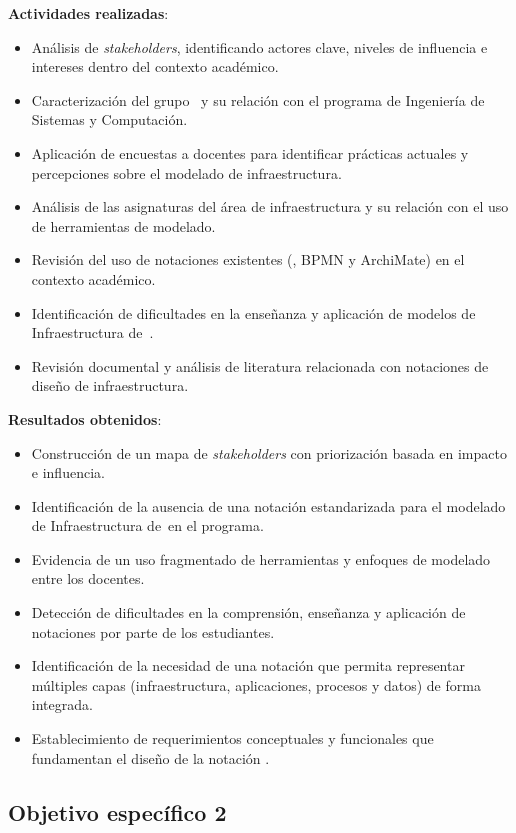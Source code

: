 \textbf{Actividades realizadas}:
\begin{itemize}
    \item Análisis de \textit{stakeholders}, identificando actores clave, niveles de influencia e intereses dentro del contexto académico.
    \item Caracterización del grupo \GRID~y su relación con el programa de Ingeniería de Sistemas y Computación.
    \item Aplicación de encuestas a docentes para identificar prácticas actuales y percepciones sobre el modelado de infraestructura.
    \item Análisis de las asignaturas del área de infraestructura y su relación con el uso de herramientas de modelado.
    \item Revisión del uso de notaciones existentes (\UML, BPMN y ArchiMate) en el contexto académico.
    \item Identificación de dificultades en la enseñanza y aplicación de modelos de Infraestructura de~\TI.
    \item Revisión documental y análisis de literatura relacionada con notaciones de diseño de infraestructura.
\end{itemize}

\textbf{Resultados obtenidos}:
\begin{itemize}
    \item Construcción de un mapa de \textit{stakeholders} con priorización basada en impacto e influencia.
    \item Identificación de la ausencia de una notación estandarizada para el modelado de Infraestructura de~\TI en el programa.
    \item Evidencia de un uso fragmentado de herramientas y enfoques de modelado entre los docentes.
    \item Detección de dificultades en la comprensión, enseñanza y aplicación de notaciones por parte de los estudiantes.
    \item Identificación de la necesidad de una notación que permita representar múltiples capas (infraestructura, aplicaciones, procesos y datos) de forma integrada.
    \item Establecimiento de requerimientos conceptuales y funcionales que fundamentan el diseño de la notación \NDITI.
\end{itemize}

\subsection{Objetivo específico 2}
\noindent

